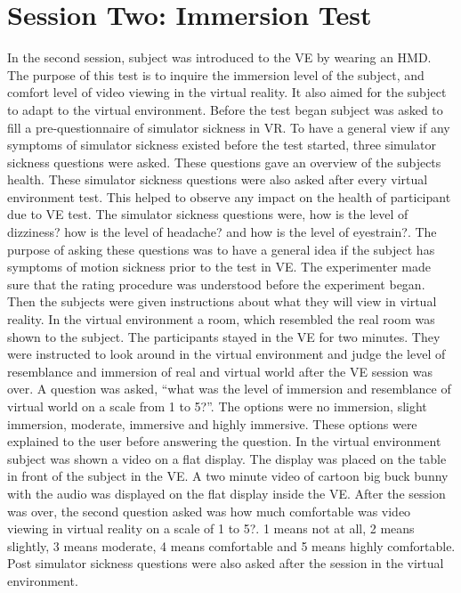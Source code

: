 \section{Session Two: Immersion Test}
In the second session, subject was introduced to the VE by wearing an HMD. The purpose
of this test is to inquire the immersion level of the subject, and comfort level of video viewing in the virtual reality. It also aimed for the subject to adapt to the virtual environment. Before the test began subject was asked to fill a pre-questionnaire of simulator sickness in VR. To have a general view if any symptoms of simulator sickness existed before the test started, three simulator sickness questions were asked. These questions gave an overview of the subjects health. These simulator sickness questions were also asked after every virtual environment test. This helped to observe any impact on the health of participant due to VE test. The simulator sickness questions were, how is the level of dizziness? how is the level of headache? and how is the level of eyestrain?. The purpose of asking these questions was to have a general idea if the subject has symptoms of motion sickness prior to the test in VE. The experimenter made sure that the rating procedure was understood before the experiment began. Then the subjects were given instructions
about what they will view in virtual reality. In the virtual environment a room, which resembled the real room was shown to the subject. The participants stayed in the VE for two minutes. They were instructed to look around in the virtual
environment and judge the level of resemblance and immersion of real and virtual world after the VE session was over. A question was asked, “what was the level of immersion and resemblance of virtual world on a scale from 1 to 5?”. The options were no immersion, slight immersion, moderate, immersive and highly immersive. These options were explained to the user before answering the question. In the virtual environment
subject was shown a video on a flat display. The display was placed on the table in front of the subject in the VE. A two minute video of cartoon big buck bunny with the audio was displayed on the flat display inside the VE. After the session was over, the second question asked was how much comfortable was video viewing in virtual reality on a scale of 1 to 5?. 1 means not at all, 2 means slightly, 3 means moderate, 4 means comfortable and 5 means highly comfortable. Post simulator sickness questions were also asked after the session in the virtual environment.
 
